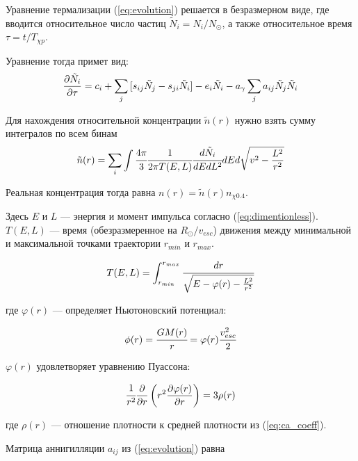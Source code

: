 Уравнение термализации (\ref{eq:evolution}) решается в безразмерном виде, где вводится относительное число частиц $\tilde{N}_i = N_i/N_{\odot}$, а также относительное время $\tau = t/T_{\chi p}$.

Уравнение тогда примет вид:
\begin{equation}
	\label{eq:relevolve}
	\frac{\partial \tilde{N}_i}{\partial \tau} = c_i +
	\sum_j{[s_{ij} \tilde{N}_{j} - s_{ji} \tilde{N}_{i} ]} - e_{i} \tilde{N}_i - a_{\gamma} \sum_j {a_{ij} \tilde{N}_j \tilde{N}_i}
\end{equation}

Для нахождения относительной концентрации $\tilde{n}(r)$ нужно взять сумму интегралов по всем бинам
\begin{equation}
	\label{eq:reldens}
	\tilde{n}(r) = \sum_i{\int{\cfrac{4\pi}{3} \cfrac{1}{2\pi T(E,L)} \cfrac{d\tilde{N}_i}{dEdL^2} dE d\sqrt{v^2-\frac{L^2}{r^2}} }}
\end{equation}

Реальная концентрация тогда равна $n(r) = \tilde{n}(r) n_{\chi 0.4}$. 

Здесь $E$ и $L$ --- энергия и момент импульса согласно (\ref{eq:dimentionless}). $T(E,L)$ --- время (обезразмеренное на $R_{\odot}/v_{esc}$) движения между минимальной и максимальной точками траектории $r_{min}$ и $r_{max}$.

\begin{equation*}
	T(E,L) = \int_{r_{min}}^{r_{max}}{\cfrac{dr}{
			\sqrt{E - \varphi(r) - \frac{L^2}{r^2}}
		} 
	}
\end{equation*}

где $\varphi(r)$ --- определяет Ньютоновский потенциал:

\begin{equation*}
	\phi(r) = \cfrac{GM(r)}{r} = \varphi(r) \cfrac{v_{esc}^2}{2} 
\end{equation*}

$\varphi(r)$ удовлетворяет уравнению Пуассона:

\begin{equation}
	\cfrac{1}{r^2}\frac{\partial }{\partial r}
	\left(r^2\frac{\partial \varphi(r)}{\partial r}\right) = 3\rho(r)
\end{equation}

где $\rho(r)$ --- отношение плотности к средней плотности из (\ref{eq:ca_coeff}).

Матрица аннигилляции $a_{ij}$ из (\ref{eq:evolution}) равна

